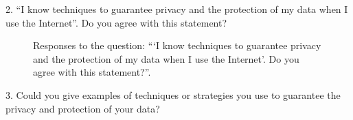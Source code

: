 2. ``I know techniques to guarantee privacy and the protection of my data when I use the Internet''. Do you agree with this statement?

\begin{figure}[H]
    \begin{center}
        \caption{Responses to the question: ```I know techniques to guarantee privacy and the protection of my data when I use the Internet'. Do you agree with this statement?''.}
        \label{fig:survey_s1_q2}
    \end{center}
\end{figure}

3. Could you give examples of techniques or strategies you use to guarantee the privacy and protection of your data?

